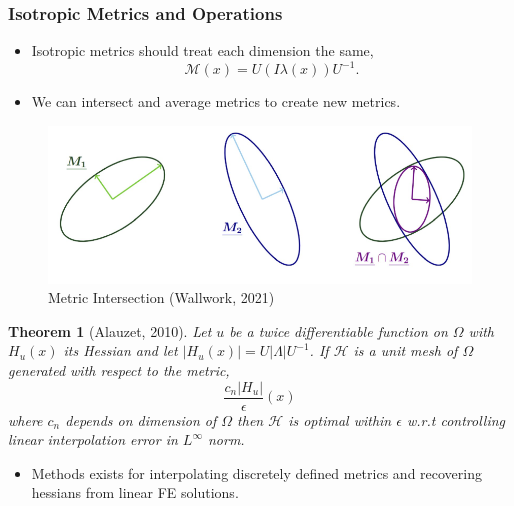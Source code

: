 \documentclass{beamer}
\newtheorem{theo}{Theorem}
\newcommand{\abs}[1]{\left| #1 \right|}
\begin{document}
  \begin{frame}
	\frametitle{Isotropic Metrics and Operations}
	\begin{itemize}
		\item Isotropic metrics should treat each dimension the same,
		\begin{equation*}
			\mathcal{M}(x) = U(I\lambda(x))U^{-1}. 
		\end{equation*}
		\vfill
		\item We can intersect and average metrics to create new metrics. 
	\end{itemize}
	\begin{figure}
		\includegraphics[width=.80\textwidth]{Figures/intersect.png}
		\caption{Metric Intersection (Wallwork, 2021)}
	\end{figure}
  \end{frame}



  \begin{frame}

	\begin{theo}[Alauzet, 2010]
		Let $u$ be a twice differentiable function on $\Omega$ with $H_u(x)$ its Hessian and let $\abs{H_u(x)} = U\abs{\Lambda}U^{-1}$. If $\mathcal{H}$ is a unit mesh of $\Omega$ generated with respect to the metric,
		\begin{equation*}
			\dfrac{c_n \abs{H_u}}{\epsilon}(x)
		\end{equation*}
		where $c_n$ depends on dimension of $\Omega$ then $\mathcal{H}$ is optimal within $\epsilon$ w.r.t controlling linear interpolation error in $L^\infty$ norm. 
	\end{theo}
	\vfill
	\begin{itemize}
		\item Methods exists for interpolating discretely defined metrics and recovering hessians from linear FE solutions. 
	\end{itemize}
  \end{frame}
\end{document}
